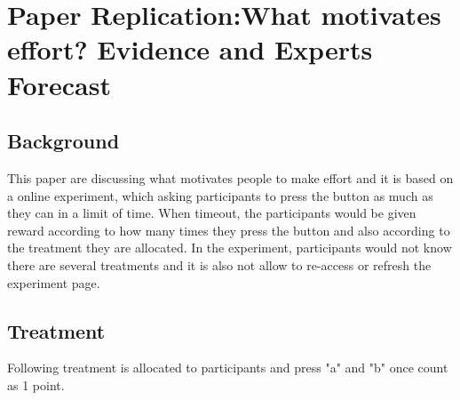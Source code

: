 \documentclass[11pt
]{article}
\author{Yu-Hsin CHEN}
\date{2023/3/25}
\begin{document}
\hypertarget{paper-replication}{%
\section{Paper Replication:What motivates effort? Evidence and Experts Forecast}\label{paper-replication}}

\hypertarget{background}{%
\subsection{Background}\label{background}}

This paper are discussing what motivates people to make effort and it is
based on a online experiment, which asking participants to press the
button as much as they can in a limit of time. When timeout, the
participants would be given reward according to how many times they press
the button and also according to the treatment they are allocated. In
the experiment, participants would not know there are several treatments
and it is also not allow to re-access or refresh the experiment page.

\hypertarget{treatment}{%
\subsection{Treatment}\label{treatment}}

Following treatment is allocated to participants and press "a" and "b" once
count as 1 point.
\end{document}
